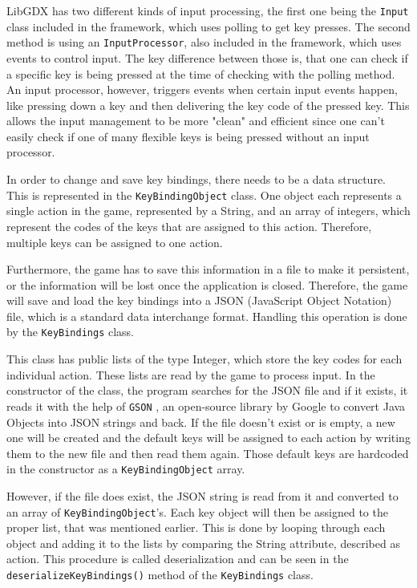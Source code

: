 \documentclass[12p]{article}
\begin{document}
LibGDX has two different kinds of input processing, the first one being the \texttt{Input} class included in the framework, which uses polling to get key presses. The second method is using an \texttt{InputProcessor}, also included in the framework, which uses events to control input. The key difference between those is, that one can check if a specific key is being pressed at the time of checking with the polling method. An input processor, however, triggers events when certain input events happen, like pressing down a key and then delivering the key code of the pressed key. This allows the input management to be more "clean" and efficient since one can't easily check if one of many flexible keys is being pressed without an input processor.

In order to change and save key bindings, there needs to be a data structure. This is represented in the \texttt{KeyBindingObject} class. One object each represents a single action in the game, represented by a String, and an array of integers, which represent the codes of the keys that are assigned to this action. Therefore, multiple keys can be assigned to one action.

Furthermore, the game has to save this information in a file to make it persistent, or the information will be lost once the application is closed. Therefore, the game will save and load the key bindings into a JSON (JavaScript Object Notation) file, which is a standard data interchange format. Handling this operation is done by the \texttt{KeyBindings} class. 

This class has public lists of the type Integer, which store the key codes for each individual action. These lists are read by the game to process input. In the constructor of the class, the program searches for the JSON file and if it exists, it reads it with the help of \texttt{GSON} \cite{GSON}, an open-source library by Google to convert Java Objects into JSON strings and back. If the file doesn't exist or is empty, a new one will be created and the default keys will be assigned to each action by writing them to the new file and then read them again. Those default keys are hardcoded in the constructor as a \texttt{KeyBindingObject} array.

However, if the file does exist, the JSON string is read from it and converted to an array of \texttt{KeyBindingObject}'s. Each key object will then be assigned to the proper list, that was mentioned earlier. This is done by looping through each object and adding it to the lists by comparing the String attribute, described as \texttt{}{action}. This procedure is called deserialization and can be seen in the \texttt{deserializeKeyBindings()} method of the \texttt{KeyBindings} class.
\end{document}
